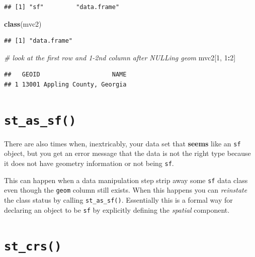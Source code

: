 \documentclass[
]{book}
\newenvironment{Shaded}{\begin{snugshade}}{\end{snugshade}}
\newcommand{\CommentTok}[1]{\textcolor[rgb]{0.56,0.35,0.01}{\textit{#1}}}
\newcommand{\DecValTok}[1]{\textcolor[rgb]{0.00,0.00,0.81}{#1}}
\newcommand{\FunctionTok}[1]{\textcolor[rgb]{0.13,0.29,0.53}{\textbf{#1}}}
\newcommand{\NormalTok}[1]{#1}
\newcommand{\SpecialCharTok}[1]{\textcolor[rgb]{0.81,0.36,0.00}{\textbf{#1}}}
\begin{document}
\begin{verbatim}
## [1] "sf"         "data.frame"
\end{verbatim}

\begin{Shaded}
\begin{Highlighting}[]
\FunctionTok{class}\NormalTok{(mvc2)}
\end{Highlighting}
\end{Shaded}

\begin{verbatim}
## [1] "data.frame"
\end{verbatim}

\begin{Shaded}
\begin{Highlighting}[]
\CommentTok{\# look at the first row and 1{-}2nd column after NULLing geom}
\NormalTok{mvc2[}\DecValTok{1}\NormalTok{, }\DecValTok{1}\SpecialCharTok{:}\DecValTok{2}\NormalTok{]}
\end{Highlighting}
\end{Shaded}

\begin{verbatim}
##   GEOID                    NAME
## 1 13001 Appling County, Georgia
\end{verbatim}

\hypertarget{st-as-sf}{%
\section{\texorpdfstring{\texttt{st\_as\_sf()}}{st\_as\_sf()}}\label{st-as-sf}}

There are also times when, inextricably, your data set that \textbf{seems} like an \texttt{sf} object, but you get an error message that the data is not the right type because it does not have geometry information or not being \texttt{sf}.

This can happen when a data manipulation step strip away some \texttt{sf} data class even though the \texttt{geom} column still exists. When this happens you can \emph{reinstate} the class status by calling \texttt{st\_as\_sf()}. Essentially this is a formal way for declaring an object to be \texttt{sf} by explicitly defining the \emph{spatial} component.

\hypertarget{st_crs}{%
\section{\texorpdfstring{\texttt{st\_crs()}}{st\_crs()}}\label{st_crs}}
\end{document}
